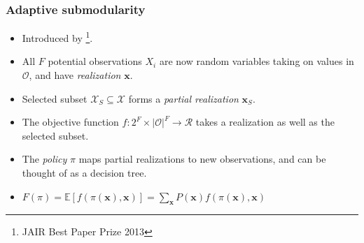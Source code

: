 \documentclass[handout]{beamer}
\begin{document}
\begin{frame}\frametitle{Adaptive submodularity}
\begin{itemize}
    \item Introduced by \cite{Golovin-and-Krause-2010-JAIR}\footnote{JAIR Best Paper Prize 2013}.
    \pause
    \item All $F$ potential observations $X_i$ are now random variables taking on values in $\mathcal{O}$, and have \emph{realization} $\mathbf{x}$.
    \pause
    \item Selected subset $\mathcal{X}_S \subseteq \mathcal{X}$ forms a \emph{partial realization} $\mathbf{x}_S$.
    \pause
    \item The objective function $f: 2^F \times |\mathcal{O}|^F \rightarrow \mathcal{R}$ takes a realization as well as the selected subset.
    \pause
    \item The \emph{policy} $\pi$ maps partial realizations to new observations, and can be thought of as a decision tree.
    \pause
    \item $F(\pi) = \mathbb{E}[f(\pi(\mathbf{x}), \mathbf{x})] = \sum_{\mathbf{x}} P(\mathbf{x}) f(\pi(\mathbf{x}), \mathbf{x})$
\end{itemize}
\centering
{}
\end{frame}
\end{document}
